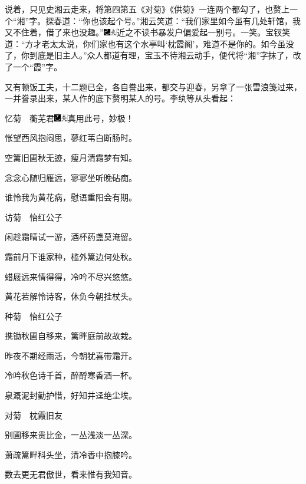 说着，只见史湘云走来，将第四第五《对菊》《供菊》一连两个都勾了，也赘上一个``湘''字。探春道：``你也该起个号。''湘云笑道：``我们家里如今虽有几处轩馆，我又不住着，借了来也没趣。''{\includegraphics[width=3mm]{../Images/00003}\includegraphics[width=3mm]{../Images/00012}\footnotesize \kaishu 近之不读书暴发户偏爱起一别号。一笑。}宝钗笑道：``方才老太太说，你们家也有这个水亭叫`枕霞阁'，难道不是你的。如今虽没了，你到底是旧主人。''众人都道有理，宝玉不待湘云动手，便代将``湘''字抹了，改了一个``霞''字。

又有顿饭工夫，十二题已全，各自誊出来，都交与迎春，另拿了一张雪浪笺过来，一并誊录出来，某人作的底下赘明某人的号。李纨等从头看起：

忆菊　蘅芜君{\includegraphics[width=3mm]{../Images/00003}\includegraphics[width=3mm]{../Images/00012}\footnotesize \kaishu 真用此号，妙极！}

怅望西风抱闷思，蓼红苇白断肠时。

空篱旧圃秋无迹，瘦月清霜梦有知。

念念心随归雁远，寥寥坐听晚砧痴。

谁怜我为黄花病，慰语重阳会有期。

访菊　怡红公子

闲趁霜晴试一游，酒杯药盏莫淹留。

霜前月下谁家种，槛外篱边何处秋。

蜡屐远来情得得，冷吟不尽兴悠悠。

黄花若解怜诗客，休负今朝挂杖头。

种菊　怡红公子

携锄秋圃自移来，篱畔庭前故故栽。

昨夜不期经雨活，今朝犹喜带霜开。

冷吟秋色诗千首，醉酹寒香酒一杯。

泉溉泥封勤护惜，好知井迳绝尘埃。

对菊　枕霞旧友

别圃移来贵比金，一丛浅淡一丛深。

萧疏篱畔科头坐，清冷香中抱膝吟。

数去更无君傲世，看来惟有我知音。


